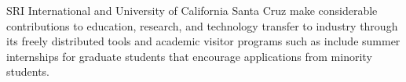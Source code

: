 SRI International and University of California Santa Cruz make considerable 
contributions to education, research, and technology transfer to industry 
through its freely distributed tools and academic visitor programs such 
as include summer internships for graduate students that encourage applications 
from minority students.